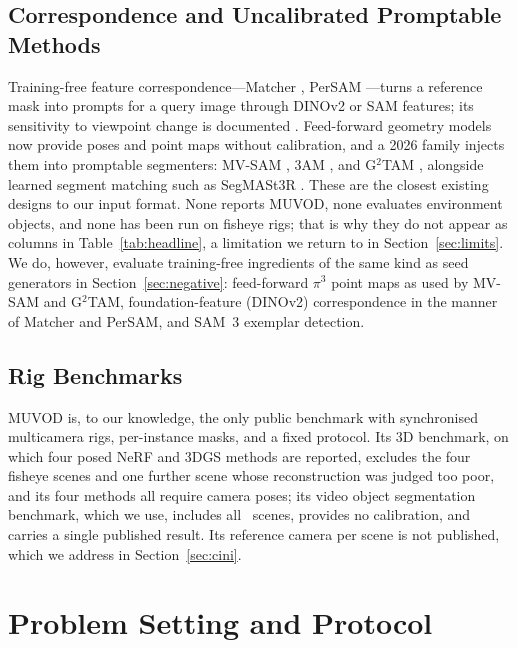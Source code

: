 \documentclass[journal]{IEEEtran}
\begin{document}
\subsection{Correspondence and Uncalibrated Promptable Methods}
Training-free feature correspondence---Matcher \cite{matcher}, PerSAM
\cite{persam}---turns a reference mask into prompts for a query image through
DINOv2 \cite{dinov2} or SAM \cite{sam} features; its sensitivity to viewpoint change is
documented \cite{probing3d}. Feed-forward geometry models
\cite{dust3r,mast3r,vggt,pi3} now provide poses and point maps without
calibration, and a 2026 family injects them into promptable segmenters:
MV-SAM \cite{mvsam}, 3AM \cite{am3}, and G$^{2}$TAM \cite{g2tam}, alongside
learned segment matching such as SegMASt3R \cite{segmast3r}. These are the
closest existing designs to our input format. None reports MUVOD, none
evaluates environment objects, and none has been run on fisheye rigs; that is
why they do not appear as columns in Table~\ref{tab:headline}, a limitation we
return to in Section~\ref{sec:limits}. We do, however, evaluate training-free
ingredients of the same kind as seed generators in Section~\ref{sec:negative}:
feed-forward $\pi^{3}$ point maps as used by MV-SAM and G$^{2}$TAM,
foundation-feature (DINOv2) correspondence in the manner of Matcher and PerSAM,
and SAM~3 exemplar detection.

\subsection{Rig Benchmarks}
MUVOD \cite{muvod} is, to our knowledge, the only public benchmark with
synchronised multicamera rigs, per-instance masks, and a fixed protocol. Its
3D benchmark, on which four posed NeRF and 3DGS methods are reported, excludes
the four fisheye scenes and one further scene whose reconstruction was
judged too poor, and its four methods all require camera poses; its video
object segmentation
benchmark, which we use, includes all \nScenes\ scenes, provides no
calibration, and carries a single published result. Its reference camera per scene is not published,
which we address in Section~\ref{sec:cini}.

\section{Problem Setting and Protocol}
\label{sec:protocol}
\end{document}
